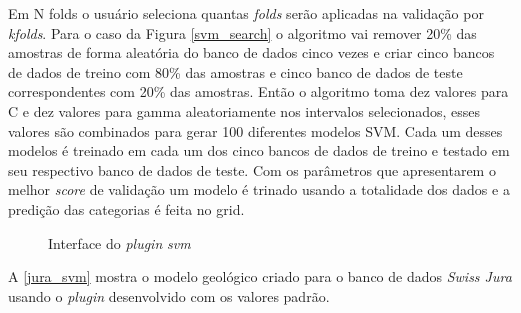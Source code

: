 Em N folds o usuário seleciona quantas \textit{folds} serão aplicadas na validação por \textit{kfolds}. Para o caso da Figura \autoref{svm_search} o algoritmo vai remover 20\% das amostras de forma aleatória do banco de dados cinco vezes e criar cinco bancos de dados de treino com 80\% das amostras e cinco banco de dados de teste correspondentes com 20\% das amostras. Então o algoritmo toma dez valores para C e dez valores para gamma aleatoriamente nos intervalos selecionados, esses valores são combinados para gerar 100 diferentes modelos SVM. Cada um desses modelos é treinado em cada um dos cinco bancos de dados de treino e testado em seu respectivo banco de dados de teste. Com os parâmetros que apresentarem o melhor \textit{score} de validação um modelo é trinado usando a totalidade dos dados e a predição das categorias é feita no grid.

\begin{figure}[H] 
    \centering
    \caption{Interface do \textit{plugin} \textit{svm}} \label{svm_plug}
     \hspace{1em}
\end{figure}

A \autoref{jura_svm} mostra o modelo geológico criado para o banco de dados \textit{Swiss Jura} usando o \textit{plugin} desenvolvido com os valores padrão.

